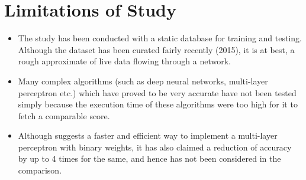 \section{Limitations of Study}

\begin{itemize}
    \item The study has been conducted with a static database for training and testing. Although the dataset has been curated fairly recently (2015), it is at best, a rough approximate of live data flowing through a network.
    \item Many complex algorithms (such as deep neural networks, multi-layer perceptron etc.) which have proved to be very accurate have not been tested simply because the execution time of these algorithms were too high for it to fetch a comparable score.
    \item Although \cite{mlp_17} suggests a faster and efficient way to implement a multi-layer perceptron with binary weights, it has also claimed a reduction of accuracy by up to 4 times for the same, and hence has not been considered in the comparison.
\end{itemize}
